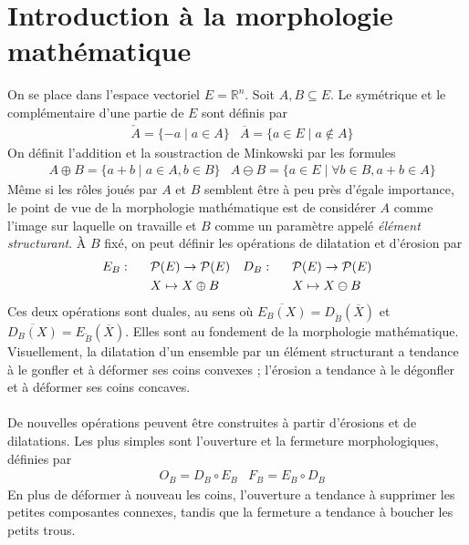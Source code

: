 \documentclass[11pt,a4paper]{report}
\newcommand{\il}{\textit}
\newcommand{\1}{\mathbbm{1}}
\renewcommand{\P}{\mathcal{P}}
\begin{document}
\newpage
\chapter{Introduction à la morphologie mathématique}
On se place dans l'espace vectoriel $E = \mathbb{R}^n$. Soit $A,B \subseteq E$. Le symétrique et le complémentaire d'une partie de $E$ sont définis par
\begin{align*} & \check{A} = \{ -a \mid a \in A \} 
& \overline{A} = \{ a \in E \mid a \notin A \} \end{align*}
On définit l'addition et la soustraction de Minkowski par les formules
\begin{align*} & A \oplus B = \{ a + b \mid a \in A, b \in B\} 
& A \ominus B = \{ a \in E \mid \forall b \in B, a + b \in A \} \end{align*}
Même si les rôles joués par $A$ et $B$ semblent être à peu près d'égale importance, le point de vue de la morphologie mathématique est de considérer $A$ comme l'image sur laquelle on travaille et $B$ comme un paramètre appelé \il{élément structurant}. \`A $B$ fixé, on peut définir les opérations de dilatation et d'érosion par
\begin{align*}
E_B : \indent & \P(E) \to \P(E) & D_B : \indent & \P(E) \to \P(E) \\
& X \mapsto X \oplus B & & X \mapsto X \ominus B 
\end{align*} 
Ces deux opérations sont duales, au sens où $\overline{E_B(X)} = D_{\check{B}}(\overline{X})$ et $\overline{D_B(X)} = E_{\check{B}}(\overline{X})$. Elles sont au fondement de la morphologie mathématique. Visuellement, la dilatation d'un ensemble par un élément structurant a tendance à le gonfler et à déformer ses coins convexes ; l'érosion a tendance à le dégonfler et à déformer ses coins concaves.\\\\
De nouvelles opérations peuvent être construites à partir d'érosions et de dilatations. Les plus simples sont l'ouverture et la fermeture morphologiques, définies par
\begin{align*}
& O_B = D_B \circ E_B & F_B = E_B \circ D_B
\end{align*}
En plus de déformer à nouveau les coins, l'ouverture a tendance à supprimer les petites composantes connexes, tandis que la fermeture a tendance à boucher les petits trous.
\end{document}
